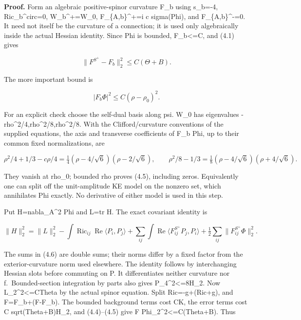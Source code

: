\documentclass[
  10pt,
]{article}
\begin{document}
\textbf{Proof.} Form an algebraic positive-spinor curvature F\_b using
s\_b=-4, Ric\_b\^{}circ=0, W\_b\^{}+=W\_0, F\_\{A,b\}\^{}+=i c
sigma(Phi), and F\_\{A,b\}\^{}-=0. It need not itself be the curvature
of a connection; it is used only algebraically inside the actual Hessian
identity. Since Phi is bounded, \textbar F\_b\textbar\textless=C, and
(4.1) gives

\[
 \|F^{S^+}-F_b\|_2^2\le C(\Theta+B).                \tag{4.4}
\]

The more important bound is

\[
                  |F_b\Phi|^2\le C(\rho-\rho_0)^2.  \tag{4.5}
\]

For an explicit check choose the self-dual basis along psi. W\_0 has
eigenvalues -rho\^{}2/4,rho\^{}2/8,rho\^{}2/8. With the
Clifford/curvature conventions of the supplied equations, the axis and
transverse coefficients of F\_b Phi, up to their common fixed
normalizations, are

\[
 \rho^2/4+1/3-c\rho/4
     =\tfrac14(\rho-4/\sqrt6)(\rho-2/\sqrt6),
 \qquad
 \rho^2/8-1/3
     =\tfrac18(\rho-4/\sqrt6)(\rho+4/\sqrt6).
\]

They vanish at rho\_0; bounded rho proves (4.5), including zeros.
Equivalently one can split off the unit-amplitude KE model on the
nonzero set, which annihilates Phi exactly. No derivative of either
model is used in this step.

Put H=nabla\_A\^{}2 Phi and L=tr H. The exact covariant identity is

\[
 \|H\|_2^2=\|L\|_2^2
 -\int\operatorname{Ric}_{ij}\operatorname{Re}\langle P_i,P_j\rangle
 +\sum_{ij}\int\operatorname{Re}\langle F_{ij}^{S^+}P_j,P_i\rangle
 +\tfrac12\sum_{ij}\|F_{ij}^{S^+}\Phi\|_2^2.         \tag{4.6}
\]

The sums in (4.6) are double sums; their norms differ by a fixed factor
from the exterior-curvature norm used elsewhere. The identity follows by
interchanging Hessian slots before commuting on P. It differentiates
neither curvature nor f.~Bounded-section integration by parts also gives
\textbar\textbar P\textbar\textbar\_4\^{}2\textless=8\textbar\textbar H\textbar\textbar\_2.
Now \textbar\textbar L\textbar\textbar\_2\^{}2\textless=CTheta by the
actual spinor equation. Split Ric=-g+(Ric+g), and F=F\_b+(F-F\_b). The
bounded background terms cost CK, the error terms cost C
sqrt(Theta+B)\textbar\textbar H\textbar\textbar\_2, and (4.4)--(4.5)
give \textbar\textbar F Phi\textbar\textbar\_2\^{}2\textless=C(Theta+B).
Thus
\end{document}
